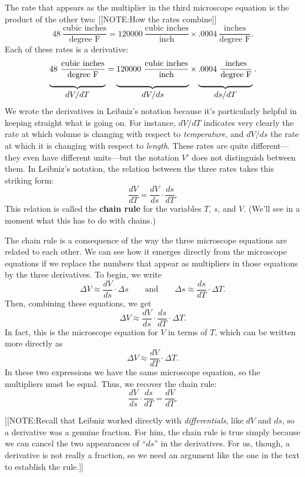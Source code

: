 The rate that appears as the multiplier in the third microscope
equation is the product of the other two:
[[NOTE:How the rates combine]]
	\[
48 \ \dfrac{\mbox{cubic inches}}{\mbox{degree F}} = 
	120000 \ \dfrac{\mbox{cubic inches}}{\mbox{inch}}
		\times 
	.0004 \ \dfrac{\mbox{inches}}{\mbox{degree F}}.
\]
Each of these rates is a derivative:
\[
\underbrace
	{48 \ \rule[-15pt]{0pt}{15pt}
		\dfrac{\mbox{cubic inches}}{\mbox{degree F}}}_
		{\displaystyle dV/dT}
	= 
\underbrace
	{120000 \ \rule[-15pt]{0pt}{15pt}
		\dfrac{\mbox{cubic inches}}{\mbox{inch}}}_
		{\displaystyle dV/ds}
	\times 
\underbrace
	{.0004 \ \rule[-15pt]{0pt}{15pt}
		\dfrac{\mbox{inches}}{\mbox{degree F}}}_
		{\displaystyle ds/dT}.
\]
We wrote the derivatives in Leibniz's notation because it's
particularly helpful in keeping straight what is going on.  For
instance, $dV/dT$ indicates very clearly the rate at which volume is
changing with respect to {\em temperature}, and $dV/ds$ the rate at
which it is changing with respect to {\em length}.  These rates are
quite different---they even have different units---but the notation
$V'$ does not distinguish between them.  In Leibniz's notation, the
relation between the three rates takes this striking form:
	\[
\dfrac{dV}{dT} = \dfrac{dV}{ds} \cdot \dfrac{ds}{dT}.
\]
This relation is called the {\bf chain rule} for the
variables $T$, $s$, and $V$.  (We'll see in a moment what this has to
do with chains.)


The chain rule is a consequence of the way the three microscope
equations are related to each other.  We can see how it emerges
directly from the microscope equations if we replace the numbers that
appear as multipliers in those equations by the three derivatives.  To
begin, we write
	\[
\Delta V \approx \dfrac{dV}{ds} \cdot \Delta s 
		\qquad \mbox{and} \qquad
		\Delta s \approx \dfrac{ds}{dT} \cdot \Delta T.
\]
Then, combining these equations, we get
	\[
\Delta V \approx \dfrac{dV}{ds} \cdot 
		\dfrac{ds}{dT} \cdot \Delta T.
\]
In fact, this is the microscope equation for $V$ in terms of $T$, which can be written more directly as
	\[
\Delta V \approx \dfrac{dV}{dT} \cdot \Delta T.
\]
In these two expressions we have the same microscope equation, so the multipliers must be equal.  Thus, we recover the chain rule:
	\[
\dfrac{dV}{ds} \cdot \dfrac{ds}{dT} = \dfrac{dV}{dT}.
\]

[[NOTE:Recall that Leibniz worked
  directly with {\em differentials}, like $dV$ and $ds$, so a
  derivative was a genuine fraction.  For him, the chain rule is true
  simply because we can cancel the two appearances of ``$ds$'' in the
  derivatives.  For us, though, a derivative is not really a fraction,
  so we need an argument like the one in the text to establish the
  rule.]]


